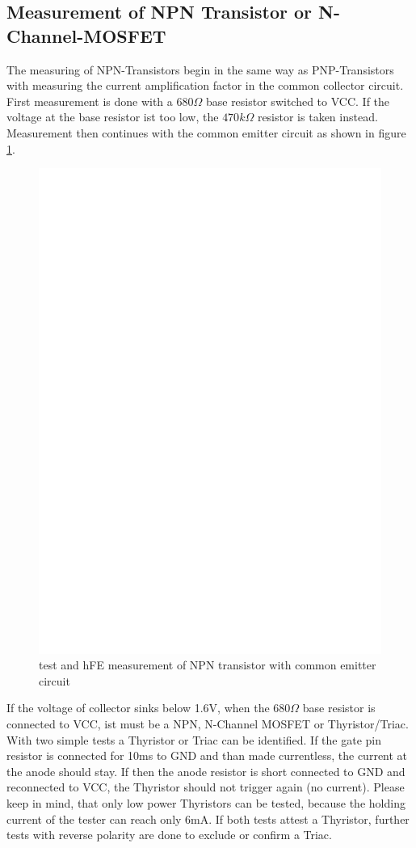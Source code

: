 \subsection{Measurement of NPN Transistor or N-Channel-MOSFET}
The measuring of NPN-Transistors begin in the same way as PNP-Transistors with measuring
the current amplification factor in the common collector circuit.
First measurement is done with a \(680\Omega\) base resistor switched to VCC. If the
voltage at the base resistor ist too low, the \(470k\Omega\) resistor is taken instead.
Measurement then continues with the common emitter circuit as shown in figure \ref{fig:npnce}.
\begin{figure}[H]
\centering
\includegraphics[]{../FIG/NPNce.eps}
\caption{test and hFE measurement of NPN transistor with common emitter circuit }
\label{fig:npnce}
\end{figure}
If the voltage of collector sinks below 1.6V, when the \(680\Omega\) base resistor is connected to VCC,
ist must be a NPN, N-Channel MOSFET or Thyristor/Triac.
With two simple tests a Thyristor or Triac can be identified. If the gate pin resistor is connected
for 10ms to GND and than made currentless, the current at the anode should stay.
If then the anode resistor is short connected to GND and reconnected to VCC, the Thyristor should not
trigger again (no current). Please keep in mind, that only low power Thyristors can be tested, because
the holding current of the tester can reach only 6mA. If both tests attest a Thyristor, further tests with
reverse polarity are done to exclude or confirm a Triac.

